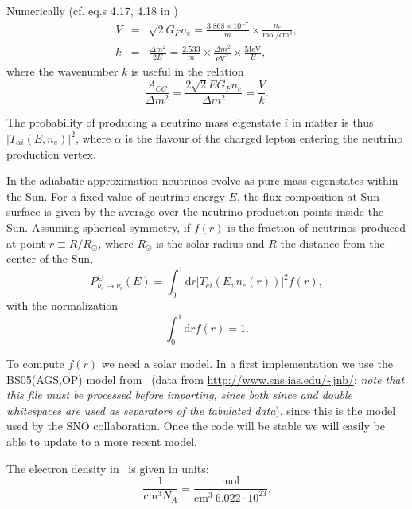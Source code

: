 \documentclass{article}
\newcommand{\MeV}[0]{\text{MeV}}
\newcommand{\cm}[0]{\text{cm}}
\newcommand{\de}[0]{\text{d}}
\begin{document}
Numerically (cf. eq.s 4.17, 4.18 in \cite{Fantini:2018itu})
\begin{eqnarray}
	V &=& \sqrt{2} G_F n_e = \frac{3.868 \times 10^{-7}}{m} \times \frac{n_e}{\text{mol}/\text{cm}^3},\\
	k &=& \frac{\Delta m^2}{2 E} = \frac{2.533}{m} \times \frac{\Delta m^2}{\text{eV}^2} \times \frac{\MeV}{E},
\end{eqnarray}
where the wavenumber $k$ is useful in the relation
\begin{equation}
	\frac{A_{CC}}{\Delta m^2} = \frac{2 \sqrt{2} E G_F n_e}{\Delta m^2} = \frac{V}{k}.
\end{equation}

The probability of producing a neutrino mass eigenstate $i$ in matter is thus $\left| T_{\alpha i}\left( E, n_e \right)\right|^2$, where $\alpha$ is the flavour of the charged lepton entering the neutrino production vertex.

In the adiabatic approximation neutrinos evolve as pure mass eigenstates within the Sun. For a fixed value of neutrino energy $E$, the flux composition  at Sun surface is given by the average over the neutrino production points inside the Sun. Assuming spherical symmetry, if $f(r)$ is the fraction of neutrinos produced at point $r \equiv R/R_\odot$, where $R_\odot$ is the solar radius and $R$ the distance from the center of the Sun, 
\begin{equation}
	P_{\nu_e \rightarrow \nu_i}^\odot(E) = \int_0^1 \de r \left| T_{e i}\left( E, n_e(r) \right)\right|^2 f(r),
\end{equation}
with the normalization
\begin{equation}
	\int_0^1 \de r f(r) = 1.
\end{equation}

To compute $f(r)$ we need a solar model. In a first implementation we use the BS05(AGS,OP) model from~\cite{Bahcall:2004pz} (data from \url{http://www.sns.ias.edu/~jnb/}; \emph{note that this file must be processed before importing, since both since and double whitespaces are used as separators of the tabulated data}), since this is the model used by the SNO collaboration. Once the code will be stable we will easily be able to update to a more recent model.

The electron density in~\cite{Bahcall:2004pz} is given in units:
\begin{equation}
	\frac{1}{\cm^3 N_A} = \frac{\text{mol}}{\cm^3\ 6.022 \cdot 10^{23} }.
\end{equation}
	
\end{document}
